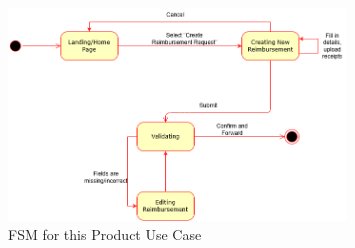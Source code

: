 \documentclass[12pt]{article}
\begin{document}
\begin{itemize}
    \begin{figure}[h!]
        \centering
        \includegraphics[width=0.8\textwidth]{./imgs/case diagram 3.png}
        \caption{FSM for this Product Use Case}
    \end{figure}

\end{itemize}
\end{document}
